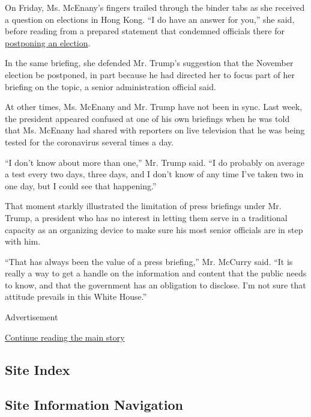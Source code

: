 On Friday, Ms. McEnany's fingers trailed through the binder tabs as she
received a question on elections in Hong Kong. ``I do have an answer for
you,'' she said, before reading from a prepared statement that condemned
officials there for
\href{https://www.nytimes3xbfgragh.onion/2020/07/31/world/asia/hong-kong-election-delayed.html}{postponing
an election}.

In the same briefing, she defended Mr. Trump's suggestion that the
November election be postponed, in part because he had directed her to
focus part of her briefing on the topic, a senior administration
official said.

At other times, Ms. McEnany and Mr. Trump have not been in sync. Last
week, the president appeared confused at one of his own briefings when
he was told that Ms. McEnany had shared with reporters on live
television that he was being tested for the coronavirus several times a
day.

``I don't know about more than one,'' Mr. Trump said. ``I do probably on
average a test every two days, three days, and I don't know of any time
I've taken two in one day, but I could see that happening.''

That moment starkly illustrated the limitation of press briefings under
Mr. Trump, a president who has no interest in letting them serve in a
traditional capacity as an organizing device to make sure his most
senior officials are in step with him.

``That has always been the value of a press briefing,'' Mr. McCurry
said. ``It is really a way to get a handle on the information and
content that the public needs to know, and that the government has an
obligation to disclose. I'm not sure that attitude prevails in this
White House.''

Advertisement

\protect\hyperlink{after-bottom}{Continue reading the main story}

\hypertarget{site-index}{%
\subsection{Site Index}\label{site-index}}

\hypertarget{site-information-navigation}{%
\subsection{Site Information
Navigation}\label{site-information-navigation}}

